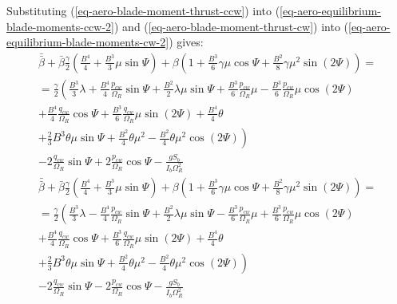 Substituting (\ref{eq-aero-blade-moment-thrust-ccw}) into (\ref{eq-aero-equilibrium-blade-moments-ccw-2}) and (\ref{eq-aero-blade-moment-thrust-cw}) into (\ref{eq-aero-equilibrium-blade-moments-cw-2}) gives:
\begin{multline}
  \label{eq-aero-flapping-coefs-ccw-1}
  \bar{\bar \beta} + \bar \beta \frac{\gamma}{2}
  \left( \frac{B^4}{4} + \frac{B^3}{3} \mu \sin \Psi \right)
  + \beta \left(
    1 + \frac{B^3}{6} \gamma \mu \cos \Psi
    + \frac{B^2}{8} \gamma \mu^2 \sin \left( 2 \Psi \right)
  \right)
  = \\ =
  \frac{\gamma}{2}
  \left(
      \frac{B^3}{3} \lambda
    + \frac{B^4}{4} \frac{p_{cw}}{\Omega_R} \sin \Psi
    + \frac{B^2}{2} \lambda \mu \sin \Psi
    + \frac{B^3}{6} \frac{p_{cw}}{\Omega_R} \mu
    - \frac{B^3}{6} \frac{p_{cw}}{\Omega_R} \mu \cos \left( 2 \Psi \right)
    \right.
    \\
    + \frac{B^4}{4} \frac{q_{cw}}{\Omega_R} \cos \Psi
    + \frac{B^3}{6} \frac{q_{cw}}{\Omega_R} \mu \sin \left( 2 \Psi \right)
    + \frac{B^4}{4} \theta
    \\
    \left.
    + \frac{2}{3} B^3 \theta \mu \sin \Psi
    + \frac{B^2}{4} \theta \mu^2
    - \frac{B^2}{4} \theta \mu^2 \cos \left( 2 \Psi \right)
  \right)
  \\
  - 2 \frac{q_{cw}}{\Omega_R} \sin \Psi
  + 2 \frac{p_{cw}}{\Omega_R} \cos \Psi
  - \frac{ g S_b }{ I_b \Omega_R^2 }
\end{multline}
\begin{multline}
  \label{eq-aero-flapping-coefs-cw-1}
  \bar{\bar \beta} + \bar \beta \frac{\gamma}{2}
  \left( \frac{B^4}{4} + \frac{B^3}{3} \mu \sin \Psi \right)
  + \beta \left(
    1 + \frac{B^3}{6} \gamma \mu \cos \Psi
    + \frac{B^2}{8} \gamma \mu^2 \sin \left( 2 \Psi \right)
  \right)
  = \\ =
  \frac{\gamma}{2}
  \left(
      \frac{B^3}{3} \lambda
    - \frac{B^4}{4} \frac{p_{cw}}{\Omega_R} \sin \Psi
    + \frac{B^2}{2} \lambda \mu \sin \Psi
    - \frac{B^3}{6} \frac{p_{cw}}{\Omega_R} \mu
    + \frac{B^3}{6} \frac{p_{cw}}{\Omega_R} \mu \cos \left( 2 \Psi \right)
    \right.
    \\
    + \frac{B^4}{4} \frac{q_{cw}}{\Omega_R} \cos \Psi
    + \frac{B^3}{6} \frac{q_{cw}}{\Omega_R} \mu \sin \left( 2 \Psi \right)
    + \frac{B^4}{4} \theta
    \\
    \left.
    + \frac{2}{3} B^3 \theta \mu \sin \Psi
    + \frac{B^2}{4} \theta \mu^2
    - \frac{B^2}{4} \theta \mu^2 \cos \left( 2 \Psi \right)
  \right)
  \\
  - 2 \frac{q_{cw}}{\Omega_R} \sin \Psi
  - 2 \frac{p_{cw}}{\Omega_R} \cos \Psi
  - \frac{ g S_b }{ I_b \Omega_R^2 }
\end{multline}

